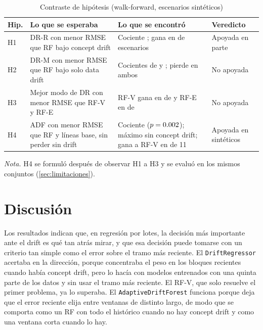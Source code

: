 \documentclass[11pt,a4paper]{article}
\newcommand{\nota}[1]{\par\smallskip\raggedright\footnotesize\textit{Nota.} #1}
\begin{document}
\begin{table}[htbp]
  \centering
  \caption{Contraste de hipótesis (walk-forward, escenarios sintéticos)}\label{tab:veredictos}
  \small
  \begin{tabularx}{\textwidth}{l X X l}
    \toprule
    Hip. & Lo que se esperaba & Lo que se encontró & Veredicto \\
    \midrule
    H1 & DR-R con menor RMSE que RF bajo concept drift &
      Cociente \hUnoGeo{}; gana en \hUnoGana{} de \nConcept{} escenarios & Apoyada en parte \\
    H2 & DR-M con menor RMSE que RF bajo solo data drift &
      Cocientes de \hDosMin{} y \hDosMax{}; pierde en ambos & No apoyada \\
    H3 & Mejor modo de DR con menor RMSE que RF-V y RF-E &
      RF-V gana en \hTresRFV{} de \hTresN{} y RF-E en \hTresRFE{} de \hTresN{} & No apoyada \\
    H4 & ADF con menor RMSE que RF y líneas base, sin perder sin drift &
      Cociente \rADFeSintWalk{} ($p=0.002$); máximo \hCuatroSinMax{} sin concept drift; gana a
      RF-V en \hCuatroVsRFV{} de 11 & Apoyada en sintéticos \\
    \bottomrule
  \end{tabularx}
  \nota{H4 se formuló después de observar H1 a H3 y se evaluó en los mismos conjuntos (\cref{sec:limitaciones}).}
\end{table}

\section{Discusión}\label{sec:discusion}

Los resultados indican que, en regresión por lotes, la decisión más importante ante el drift es qué
tan atrás mirar, y que esa decisión puede tomarse con un criterio tan simple como el error sobre el
tramo más reciente. El \texttt{DriftRegressor} acertaba en la dirección, porque concentraba el peso
en los bloques recientes cuando había concept drift, pero lo hacía con modelos entrenados con una
quinta parte de los datos y sin usar el tramo más reciente. El RF-V, que solo resuelve el primer
problema, ya lo superaba. El \texttt{AdaptiveDriftForest} funciona porque deja que el error reciente
elija entre ventanas de distinto largo, de modo que se comporta como un RF con todo el histórico
cuando no hay concept drift y como una ventana corta cuando lo hay.
\end{document}
